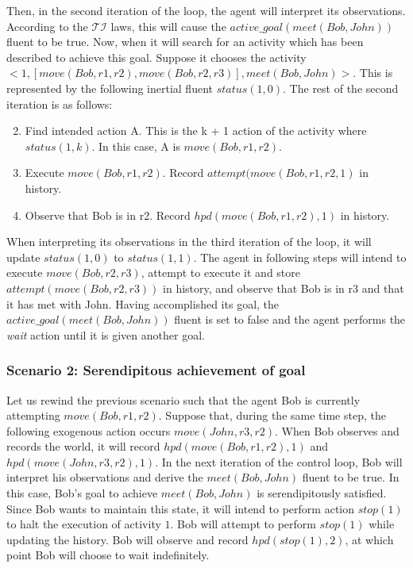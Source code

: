Then, in the second iteration of the loop, the agent will interpret its observations.
According to the $\mathcal{TI}$ laws, this will cause the $active\_goal(meet(Bob, John))$ fluent to be true.
Now, when it will search for an activity which has been described to achieve this goal.
Suppose it chooses the activity $<1, [move(Bob, r1,r2), move(Bob, r2, r3)],meet(Bob,John)>$.
This is represented by the following inertial fluent $status(1,0)$.
The rest of the second iteration is as follows:

\begin{enumerate}
    \setcounter{enumi}{1}
    \item Find intended action A.
        This is the k + 1 action of the activity where $status(1, k)$.
        In this case, A is $move(Bob, r1, r2)$.
    \item Execute $move(Bob, r1, r2)$.
        Record $attempt(move(Bob, r1, r2, 1)$ in history.
    \item Observe that Bob is in r2.
        Record $hpd(move(Bob, r1, r2),1)$ in history.
\end{enumerate}

When interpreting its observations in the third iteration of the loop, it will update $status(1,0)$ to $status(1,1)$.
The agent in following steps will intend to execute $move(Bob, r2, r3)$, attempt to execute it and store $attempt(move(Bob, r2, r3))$ in history, and observe that Bob is in r3 and that it has met with John.
Having accomplished its goal, the $active\_goal(meet(Bob, John))$ fluent is set to false and the agent performs the \textit{wait} action until it is given another goal.

\subsubsection{Scenario 2: Serendipitous achievement of goal~\cite{blount_towards_2014}}
\label{subsubsec:aia_scenario_2}

Let us rewind the previous scenario such that the agent Bob is currently attempting $move(Bob, r1, r2)$.
Suppose that, during the same time step, the following exogenous action occurs $move(John, r3, r2)$.
When Bob observes and records the world, it will record $hpd(move(Bob, r1, r2), 1)$ and $hpd(move(John,r3,r2), 1)$.
In the next iteration of the control loop, Bob will interpret his observations and derive the $meet(Bob, John)$ fluent to be true.
In this case, Bob's goal to achieve $meet(Bob, John)$ is serendipitously satisfied.
Since Bob wants to maintain this state, it will intend to perform action $stop(1)$ to halt the execution of activity $1$.
Bob will attempt to perform $stop(1)$ while updating the history.
Bob will observe and record $hpd(stop(1), 2)$, at which point Bob will choose to wait indefinitely.

